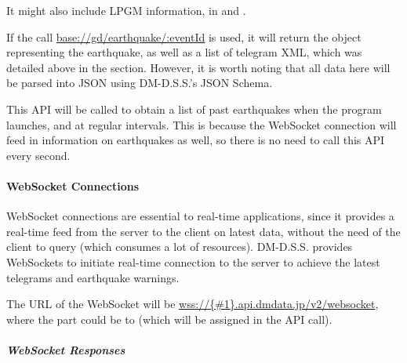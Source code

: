 It might also include LPGM information, in  and .

If the call \url{base://gd/earthquake/:eventId} is used, it will return the object representing the earthquake, as well as a list of telegram XML, which was detailed above in the  section. However, it is worth noting that all data here will be parsed into JSON using DM-D.S.S.'s JSON Schema.

This API will be called to obtain a list of past earthquakes when the program launches, and at regular intervals. This is because the WebSocket connection will feed in information on earthquakes as well, so there is no need to call this API every second.

\paragraph{WebSocket Connections}

WebSocket connections are essential to real-time applications, since it provides a real-time feed from the server to the client on latest data, without the need of the client to query (which consumes a lot of resources). DM-D.S.S. provides WebSockets to initiate real-time connection to the server to achieve the latest telegrams and earthquake warnings.

The URL of the WebSocket will be \url{wss://{#1}.api.dmdata.jp/v2/websocket}, where the  part could be  to  (which will be assigned in the  API call).

\subparagraph{WebSocket Responses}

